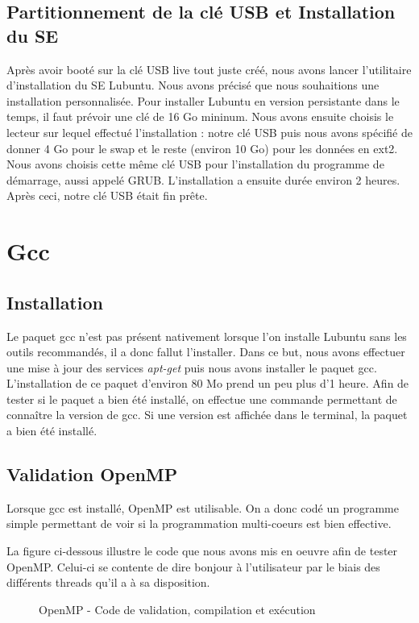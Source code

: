 \documentclass[final]{polytech/polytech}
\begin{document}
\subsection{Partitionnement de la clé USB et Installation du SE}
Après avoir booté sur la clé USB live tout juste créé, nous avons lancer l'utilitaire d'installation du SE Lubuntu. Nous avons précisé que nous souhaitions une installation personnalisée. Pour installer Lubuntu en version persistante dans le temps, il faut prévoir une clé de 16 Go mininum. Nous avons ensuite choisis le lecteur sur lequel effectué l'installation : notre clé USB puis nous avons spécifié de donner 4 Go pour le swap et le reste (environ 10 Go) pour les données en ext2. Nous avons choisis cette même clé USB pour l'installation du programme de démarrage, aussi appelé GRUB. L'installation a ensuite durée environ 2 heures. Après ceci, notre clé USB était fin prête.

\section{Gcc}

\subsection{Installation}
Le paquet gcc n'est pas présent nativement lorsque l'on installe Lubuntu sans les outils recommandés, il a donc fallut l'installer. Dans ce but, nous avons effectuer une mise à jour des services \textit{apt-get} puis nous avons installer le paquet gcc. L'installation de ce paquet d'environ 80 Mo prend un peu plus d'1 heure. Afin de tester si le paquet a bien été installé, on effectue une commande permettant de connaître la version de gcc. Si une version est affichée dans le terminal, la paquet a bien été installé.

\subsection{Validation OpenMP}
Lorsque gcc est installé, OpenMP est utilisable. On a donc codé un programme simple permettant de voir si la programmation multi-coeurs est bien effective.

La figure ci-dessous illustre le code que nous avons mis en oeuvre afin de tester OpenMP. Celui-ci se contente de dire bonjour à l'utilisateur par le biais des différents threads qu'il a à sa disposition.

\vfill\eject

\begin{figure}
	\caption{OpenMP - Code de validation, compilation et exécution}
	\label{fig:openmp_hello}
\end{figure}
\end{document}
